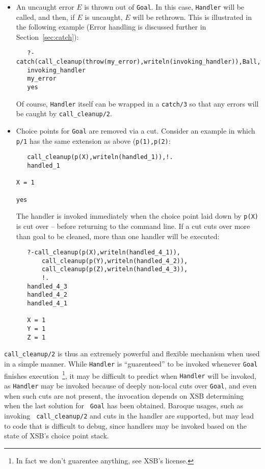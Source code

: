 \begin{description}
\begin{itemize}
\item An uncaught error $E$ is thrown out of {\tt Goal}.  In this
  case, {\tt Handler} will be called, and then, if $E$ is uncaught,
  $E$ will be rethrown.  This is illustrated in the following example
  (Error handling is discussed further in Section~\ref{sec:catch}):
\begin{verbatim}
   ?- catch(call_cleanup(throw(my_error),writeln(invoking_handler)),Ball,write(Ball)).
   invoking_handler
   my_error
   yes
\end{verbatim}
Of course, {\tt Handler} itself can be wrapped in a {\tt catch/3} so
that any errors will be caught by {\tt call\_cleanup/2}.

\item Choice points for {\tt Goal} are removed via a cut.  Consider an
  example in which {\tt p/1} has the same extension as above ({\tt p(1),p(2)}:
\begin{verbatim}
   call_cleanup(p(X),writeln(handled_1)),!.
   handled_1

X = 1

yes	
\end{verbatim}
The handler is invoked immediately when the choice point laid down by
{\tt p(X)} is cut over -- before returning to the command line.  If a
cut cuts over more than goal to be cleaned, more than one handler will be executed:
\begin{verbatim}
   ?-call_cleanup(p(X),writeln(handled_4_1)),
       call_cleanup(p(Y),writeln(handled_4_2)),
       call_cleanup(p(Z),writeln(handled_4_3)),
       !.
   handled_4_3
   handled_4_2
   handled_4_1
 
   X = 1
   Y = 1
   Z = 1
\end{verbatim}
\end{itemize}

{\tt call\_cleanup/2} is thus an extremely powerful and flexible
mechanism when used in a simple manner.  While {\tt Handler} is
``guarenteed'' to be invoked whenever {\tt Goal} finishes
execution~\footnote{In fact we don't guarentee anything, see XSB's
  license.}, it may be difficult to predict when {\tt Handler} will be
invoked, as {\tt Handler} may be invoked because of deeply non-local
cuts over {\tt Goal}, and even when such cuts are not present, the
invocation depends on XSB determining when the last solution for {\tt
  Goal} has been obtained.  Baroque usages, such as invoking {\tt
  call\_cleanup/2} and cuts in the handler are supported, but may lead
to code that is difficult to debug, since handlers may be invoked
based on the state of XSB's choice point stack.  


\end{description}
